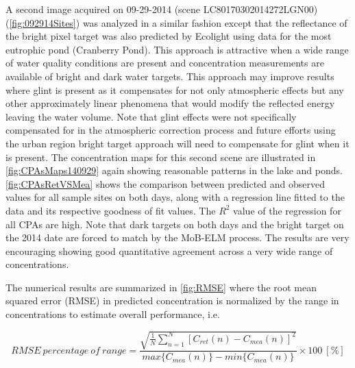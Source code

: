 \documentclass[onecolumn,3p,letterpaper]{elsarticle}
\begin{document}


A second image acquired on 09-29-2014 (scene LC80170302014272LGN00) (\autoref{fig:092914Sites}) was analyzed in a similar fashion except that the reflectance of the bright pixel target was also predicted by Ecolight using data for the most eutrophic pond (Cranberry Pond). This approach is attractive when a wide range of water quality conditions are present and concentration measurements are available of bright and dark water targets. This approach may improve results where glint is present as it compensates for not only atmospheric effects but any other approximately linear phenomena that would modify the reflected energy leaving the water volume. Note that glint effects were not specifically compensated for in the atmospheric correction process and future efforts using the urban region bright target approach will need to compensate for glint when it is present. The concentration maps for this second scene are illustrated in \autoref{fig:CPAsMaps140929} again showing reasonable patterns in the lake and ponds. \autoref{fig:CPAsRetVSMea} shows the comparison between predicted and observed values for all sample sites on both days, along with a regression line fitted to the data and its respective goodness of fit values. The $R^2$ value of the regression for all CPAs are high. Note that dark targets on both days and the bright target on the 2014 date are forced to match by the MoB-ELM process. The results are very encouraging showing good quantitative agreement across a very wide range of concentrations. 

The numerical results are summarized in \autoref{fig:RMSE} where the root mean squared error (RMSE) in predicted concentration is normalized by the range in concentrations to estimate overall performance, i.e.

\begin{equation}
\label{eq:error_percentage}
	RMSE~percentage~of~range =\frac{\sqrt{\frac{1}{N}\sum_{n=1}^N{\left[C_{ret}(n) - C_{mea}(n)\right]^2}}}{max\{C_{mea}(n)\} - min\{C_{mea}(n)\}}\times100 ~[\%]
\end{equation}
\end{document}
